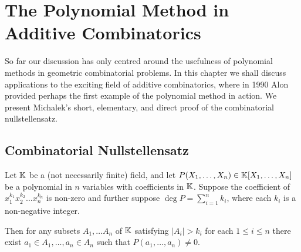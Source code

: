 \chapter{The Polynomial Method in Additive Combinatorics \label{chap:alon}}
So far our discussion has only centred around the usefulness of polynomial methods in geometric combinatorial problems. 
In this chapter we shall discuss applications to the exciting field of additive combinatorics, where in 1990 Alon provided perhaps
the first example of the polynomial method in action.\cite{alon1999combinatorial} We present Michalek's short, elementary, and direct proof of the combinatorial nullstellensatz.\cite{michalek2010}
\section{Combinatorial Nullstellensatz}
\begin{theorem}
    Let $\mathbb K$ be a (not necessarily finite) field, and let $P(X_1,\dots, X_n) \in \mathbb K[X_1,\dots, X_n]$ be a polynomial in $n$ variables with coefficients in $\mathbb K$. Suppose the coefficient of $x_1^{k_1}x_2^{k_2}\dots x_n^{k_n}$ is non-zero and further suppose $\deg P = \sum_{i=1}^n k_i$, where each $k_i$ is a non-negative integer.

    Then for any subsets $A_1,\dots A_n$ of $\mathbb K$ satisfying $|A_i| > k_i$ for each $1\leq i\leq n$ there exist $a_1 \in A_1, \dots, a_n \in A_n$ such that $P(a_1,\dots, a_n) \neq 0$.
    \label{comb-nullstellensatz}
\end{theorem}
